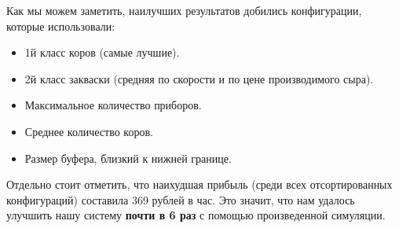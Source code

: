 \documentclass[a4paper, 14pt]{article}
\begin{document}
Как мы можем заметить, наилучших результатов добились конфигурации, которые использовали:

\begin{itemize}
	\item 1й класс коров (самые лучшие).
	\item 2й класс закваски (средняя по скорости и по цене производимого сыра).
	\item Максимальное количество приборов.
	\item Среднее количество коров.
	\item Размер буфера, близкий к нижней границе.
\end{itemize}

Отдельно стоит отметить, что наихудшая прибыль (среди всех отсортированных конфигураций) составила 369 рублей в час. Это значит, что нам удалось улучшить нашу систему \textbf{почти в 6 раз} с помощью произведенной симуляции.
\end{document}
